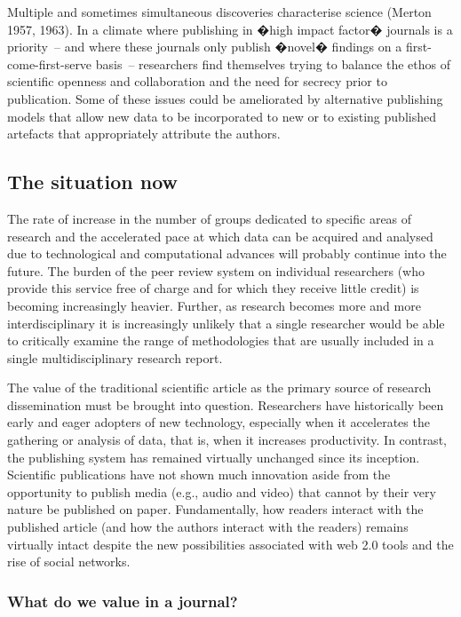\documentclass[final,authoryear,3p]{elsarticle-open-drafting}
\begin{document}
Multiple and sometimes simultaneous discoveries characterise science (Merton 1957, 1963). In a climate where publishing in �high impact factor� journals is a priority~-- and where these journals only publish �novel� findings on a first-come-first-serve 
basis~-- researchers find themselves trying to balance the ethos of scientific openness and collaboration and the need for 
secrecy prior to publication. Some of these issues could be ameliorated by alternative publishing models that allow new data to 
be incorporated to new or to existing published artefacts that appropriately attribute the authors.

\subsection{The situation now}

The rate of increase in the number of groups dedicated to specific areas of research and the accelerated pace at which data can 
be acquired and analysed due to technological and computational advances will probably continue into the future. The burden of 
the peer review system on individual researchers (who provide this service free of charge and for which they receive little credit) 
is becoming increasingly heavier. Further, as research becomes more and more interdisciplinary it is increasingly unlikely that a 
single researcher would be able to critically examine the range of methodologies that are usually included in a single 
multidisciplinary research report.

The value of the traditional scientific article as the primary source of research dissemination must be brought into question. 
Researchers have historically been early and eager adopters of new technology, especially when it accelerates the gathering or 
analysis of data, that is, when it increases productivity. In contrast, the publishing system has remained virtually unchanged since 
its inception. Scientific publications have not shown much innovation aside from the opportunity to publish media (e.g., audio and 
video) that cannot by their very nature be published on paper. Fundamentally, how readers interact with the published article 
(and how the authors interact with the readers) remains virtually intact despite the new possibilities associated with web 2.0 tools 
and the rise of social networks.

\subsubsection{What do we value in a journal?}
\end{document}
